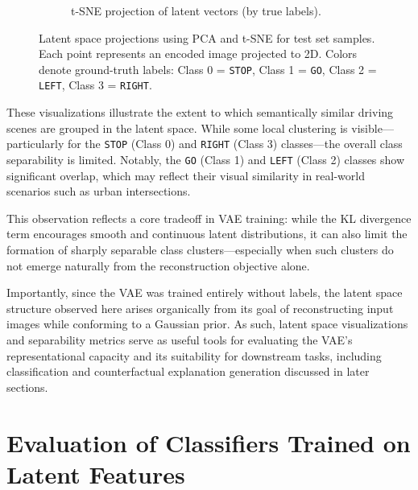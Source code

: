 \begin{figure}[htbp]
\begin{subfigure}[b]{0.49\textwidth}
        \caption{t-SNE projection of latent vectors (by true labels).}
        \label{fig:tsne_true}
    \end{subfigure}
    \caption[Latent space projections using PCA and t-SNE]{%
Latent space projections using PCA and t-SNE for test set samples. Each point represents an encoded image projected to 2D. Colors denote ground-truth labels: Class 0 = \texttt{STOP}, Class 1 = \texttt{GO}, Class 2 = \texttt{LEFT}, Class 3 = \texttt{RIGHT}.}
    \label{fig:latent_space_visualizations}
\end{figure}


These visualizations illustrate the extent to which semantically similar driving scenes are grouped in the latent space. While some local clustering is visible—particularly for the \texttt{STOP} (Class 0) and \texttt{RIGHT} (Class 3) classes—the overall class separability is limited. Notably, the \texttt{GO} (Class 1) and \texttt{LEFT} (Class 2) classes show significant overlap, which may reflect their visual similarity in real-world scenarios such as urban intersections.

This observation reflects a core tradeoff in VAE training: while the KL divergence term encourages smooth and continuous latent distributions, it can also limit the formation of sharply separable class clusters—especially when such clusters do not emerge naturally from the reconstruction objective alone.

Importantly, since the VAE was trained entirely without labels, the latent space structure observed here arises organically from its goal of reconstructing input images while conforming to a Gaussian prior. As such, latent space visualizations and separability metrics serve as useful tools for evaluating the VAE’s representational capacity and its suitability for downstream tasks, including classification and counterfactual explanation generation discussed in later sections.












\clearpage



\section{Evaluation of Classifiers Trained on Latent Features} \label{sec:classifier_eval}

